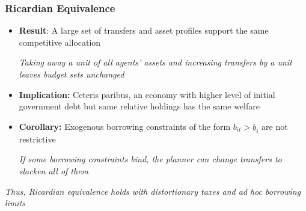 \documentclass{beamer}
\begin{document}
 \begin{frame}
  \frametitle{Ricardian Equivalence}
  \begin{itemize}
   \item \textbf{Result}: A large set of transfers and asset profiles support the same competitive allocation
   
   \emph{Taking away a unit of all agents' assets and increasing transfers by a unit leaves budget sets unchanged}
   
   \vspace{2mm}
   
   \item \textbf{Implication:} Ceteris paribus, an economy with higher level of initial government debt  but same relative holdings has the same welfare
   
   \vspace{2mm}
   
   \item \textbf{Corollary:} Exogenous borrowing constraints of the form $b_{it}>\underline{b}_i$ are not restrictive
\vspace{2mm}
   
   
 \emph {If some borrowing constraints bind, the planner can change transfers to  slacken   \emph{all}  of them}
  \end{itemize}
  \color{red}\emph{Thus, Ricardian equivalence holds with distortionary taxes and ad hoc borrowing limits}

\end{frame}
\end{document}
